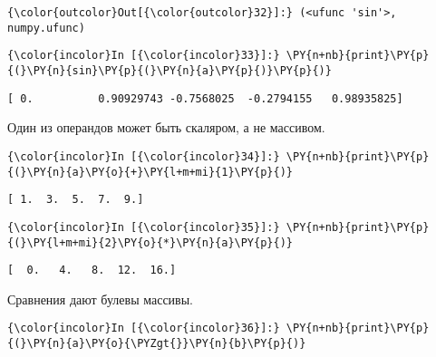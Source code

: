             \begin{Verbatim}[commandchars=\\\{\}]
{\color{outcolor}Out[{\color{outcolor}32}]:} (<ufunc 'sin'>, numpy.ufunc)
\end{Verbatim}
        
    \begin{Verbatim}[commandchars=\\\{\}]
{\color{incolor}In [{\color{incolor}33}]:} \PY{n+nb}{print}\PY{p}{(}\PY{n}{sin}\PY{p}{(}\PY{n}{a}\PY{p}{)}\PY{p}{)}
\end{Verbatim}

    \begin{Verbatim}[commandchars=\\\{\}]
[ 0.          0.90929743 -0.7568025  -0.2794155   0.98935825]

    \end{Verbatim}

    Один из операндов может быть скаляром, а не массивом.

    \begin{Verbatim}[commandchars=\\\{\}]
{\color{incolor}In [{\color{incolor}34}]:} \PY{n+nb}{print}\PY{p}{(}\PY{n}{a}\PY{o}{+}\PY{l+m+mi}{1}\PY{p}{)}
\end{Verbatim}

    \begin{Verbatim}[commandchars=\\\{\}]
[ 1.  3.  5.  7.  9.]

    \end{Verbatim}

    \begin{Verbatim}[commandchars=\\\{\}]
{\color{incolor}In [{\color{incolor}35}]:} \PY{n+nb}{print}\PY{p}{(}\PY{l+m+mi}{2}\PY{o}{*}\PY{n}{a}\PY{p}{)}
\end{Verbatim}

    \begin{Verbatim}[commandchars=\\\{\}]
[  0.   4.   8.  12.  16.]

    \end{Verbatim}

    Сравнения дают булевы массивы.

    \begin{Verbatim}[commandchars=\\\{\}]
{\color{incolor}In [{\color{incolor}36}]:} \PY{n+nb}{print}\PY{p}{(}\PY{n}{a}\PY{o}{\PYZgt{}}\PY{n}{b}\PY{p}{)}
\end{Verbatim}

